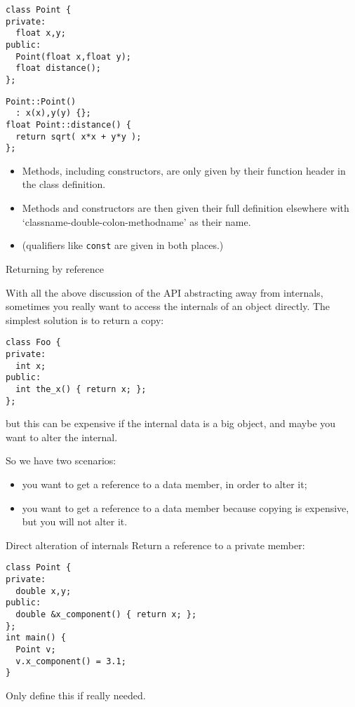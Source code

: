 \begin{multicols}{2}
\begin{lstlisting}
class Point {
private:
  float x,y;
public:
  Point(float x,float y);
  float distance();
};
\end{lstlisting}
\columnbreak
\begin{lstlisting}
Point::Point()
  : x(x),y(y) {};
float Point::distance() {
  return sqrt( x*x + y*y );
};
\end{lstlisting}
\end{multicols}
\begin{itemize}
\item Methods, including constructors, are only given by their function header
  in the class definition.
\item Methods and constructors are then given their full definition elsewhere
  with
  `classname-double-colon-methodname' as their name.
\item (qualifiers like \lstinline{const} are given in both places.)
\end{itemize}

 {Returning by reference}

With all the above discussion of the \ac{API} abstracting away from internals,
sometimes you really want to access the internals of an object directly.
The simplest solution is to return a copy:
\begin{lstlisting}
class Foo {
private:
  int x;
public:
  int the_x() { return x; };
};
\end{lstlisting}
but this can be expensive if the internal data is a big object,
and maybe you want to alter the internal.

So we have two scenarios:
\begin{itemize}
\item you want to get a reference to a data member, in order to alter it;
\item you want to get a reference to a data member because copying is expensive,
  but you will not alter it.
\end{itemize}

\begin{block}{Direct alteration of internals}
  \label{sl:obj-return-ref}
  Return a reference to a private member:
\begin{lstlisting}
class Point {
private:
  double x,y;
public:
  double &x_component() { return x; };
};
int main() {
  Point v;
  v.x_component() = 3.1;
}
\end{lstlisting}
Only define this if really needed.
\end{block}

